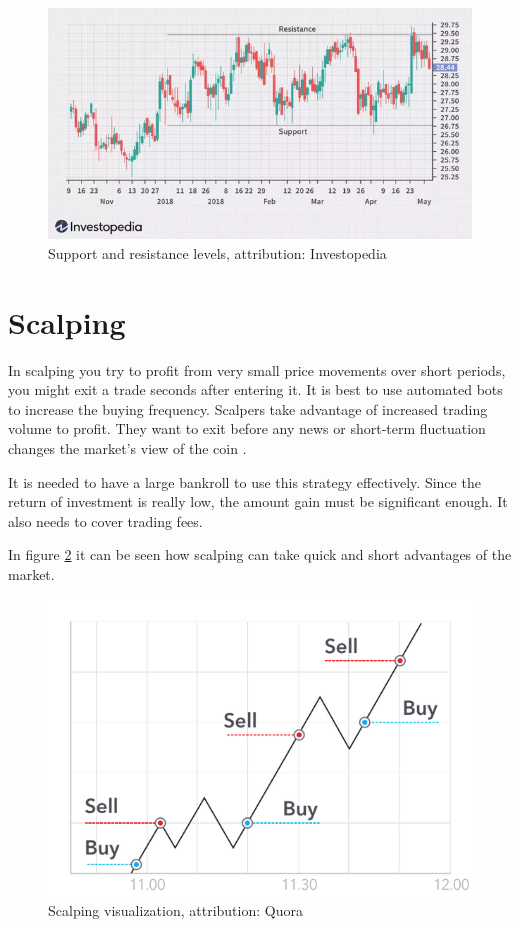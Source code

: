 \begin{figure}[h!]
    \label{sup-and-res-levels}
    \centering
    \includegraphics[width=\columnwidth]{figures/dotdash-final-trading-range.png}
    \caption{Support and resistance levels, attribution: Investopedia}
\end{figure}

\section{Scalping}
In scalping you try to profit from very small price movements over short periods, you might exit a trade seconds after entering it. It is best to use automated bots to increase the buying frequency. Scalpers take advantage of increased trading volume to profit. They want to exit before any news or short-term fluctuation changes the market's view of the coin \cite{best-crypto-daytrading}.

It is needed to have a large bankroll to use this strategy effectively. Since the return of investment is really low, the amount gain must be significant enough. It also needs to cover trading fees. 

In figure \ref{scalping-figure} it can be seen how scalping can take quick and short advantages of the market.

\begin{figure}[h!]
    \label{scalping-figure}
    \centering
    \includegraphics[width=\columnwidth]{figures/scalping.png}
    \caption{Scalping visualization, attribution: Quora}
\end{figure}

